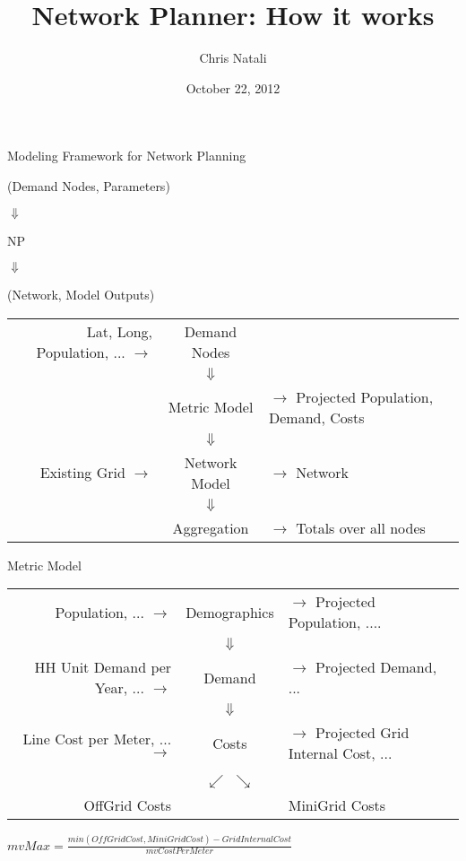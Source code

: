 \documentclass{beamer}
\title{Network Planner:  How it works}
\author{Chris Natali}
\institute{Modi Labs at Columbia University}
\date{October 22, 2012}
\begin{document}
\begin{frame}
  \begin{center}
  {\large Modeling Framework for Network Planning}

  \bigskip

  (Demand Nodes, Parameters) 
  
  $\Downarrow$ 
  
  NP 
  
  $\Downarrow$ 
  
  (Network, Model Outputs)
  \end{center}
\end{frame}

\begin{frame}
  \begin{tabular}{r c l}
    {\tiny Lat, Long, Population, ...} $\rightarrow$ & Demand Nodes & \\
    & $\Downarrow$ & \\
    & Metric Model & $\rightarrow$ {\tiny Projected Population, Demand, Costs} \\
    & $\Downarrow$ & \\
    {\tiny Existing Grid} $\rightarrow$ & Network Model & $\rightarrow$ {\tiny Network} \\
    & $\Downarrow$ & \\
    & Aggregation & $\rightarrow$ {\tiny Totals over all nodes} \\
  \end{tabular}
\end{frame}

\begin{frame}{Metric Model}
  \begin{tabular}{r c l}
    {\tiny Population, ...} $\rightarrow$ & Demographics &  $\rightarrow$ {\tiny Projected Population, ....} \\
    & $\Downarrow$ & \\
    {\tiny HH Unit Demand per Year, ...} $\rightarrow$ & Demand & $\rightarrow$ {\tiny Projected Demand, ...} \\
    & $\Downarrow$ & \\
        {\tiny Line Cost per Meter, ...} $\rightarrow$ & Costs & $\rightarrow$ {\tiny Projected Grid Internal Cost, ...} \\
    & $\swarrow$ $\searrow$ & \\
    OffGrid Costs & & MiniGrid Costs\\
  \end{tabular}

  \bigskip 

  \begin{center}
  $mvMax = \frac{min(OffGridCost, MiniGridCost) - GridInternalCost}{mvCostPerMeter}$
  \end{center}
\end{frame}
\end{document}

